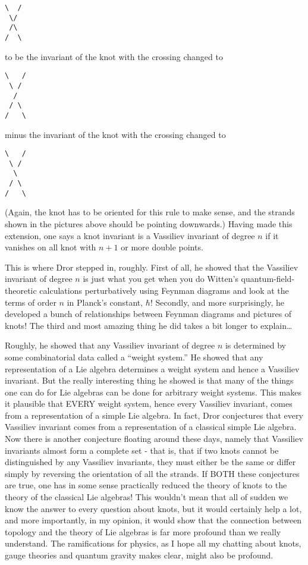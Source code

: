 \documentclass{article}
\begin{document}
\begin{verbatim}
\  /
 \/
 /\
/  \
\end{verbatim}

to be the invariant of the knot with the crossing changed to

\begin{verbatim}
\   /
 \ /
  /
 / \
/   \
\end{verbatim}

minus the invariant of the knot with the crossing changed to

\begin{verbatim}
\   /
 \ /
  \
 / \
/   \
\end{verbatim}

(Again, the knot has to be oriented for this rule to make sense, and the
strands shown in the pictures above should be pointing downwards.)
Having made this extension, one says a knot invariant is a Vassiliev
invariant of degree \(n\) if it vanishes on all knot with \(n+1\) or
more double points.

This is where Dror stepped in, roughly. First of all, he showed that the
Vassiliev invariant of degree \(n\) is just what you get when you do
Witten's quantum-field-theoretic calculations perturbatively using
Feynman diagrams and look at the terms of order \(n\) in Planck's
constant, \(\hbar\)! Secondly, and more surprisingly, he developed a
bunch of relationships between Feynman diagrams and pictures of knots!
The third and most amazing thing he did takes a bit longer to
explain\ldots{}

Roughly, he showed that any Vassiliev invariant of degree \(n\) is
determined by some combinatorial data called a ``weight system.'' He
showed that any representation of a Lie algebra determines a weight
system and hence a Vassiliev invariant. But the really interesting thing
he showed is that many of the things one can do for Lie algebras can be
done for arbitrary weight systems. This makes it plausible that EVERY
weight system, hence every Vassiliev invariant, comes from a
representation of a simple Lie algebra. In fact, Dror conjectures that
every Vassiliev invariant comes from a representation of a classical
simple Lie algebra. Now there is another conjecture floating around
these days, namely that Vassiliev invariants almost form a complete set
- that is, that if two knots cannot be distinguished by any Vassiliev
invariants, they must either be the same or differ simply by reversing
the orientation of all the strands. If BOTH these conjectures are true,
one has in some sense practically reduced the theory of knots to the
theory of the classical Lie algebras! This wouldn't mean that all of
sudden we know the answer to every question about knots, but it would
certainly help a lot, and more importantly, in my opinion, it would show
that the connection between topology and the theory of Lie algebras is
far more profound than we really understand. The ramifications for
physics, as I hope all my chatting about knots, gauge theories and
quantum gravity makes clear, might also be profound.
\end{document}

